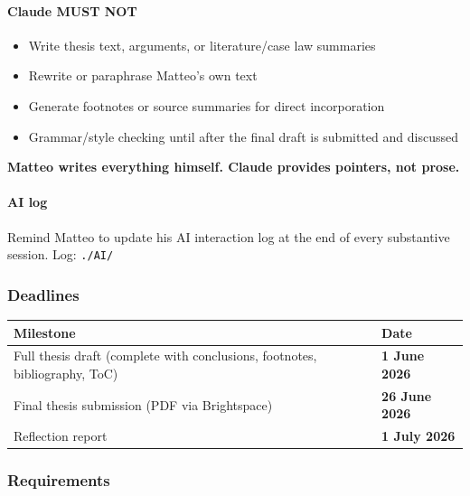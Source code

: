 \paragraph{Claude MUST NOT}
\begin{itemize}
  \item Write thesis text, arguments, or literature/case law summaries
  \item Rewrite or paraphrase Matteo's own text
  \item Generate footnotes or source summaries for direct incorporation
  \item Grammar/style checking until after the final draft is submitted and discussed
\end{itemize}

\textbf{Matteo writes everything himself. Claude provides pointers, not prose.}

\paragraph{AI log}
Remind Matteo to update his AI interaction log at the end of every substantive
session. Log: \texttt{./AI/}

\subsubsection{Deadlines}

\begin{longtable}{@{}>{\raggedright\arraybackslash}p{}
                    >{\raggedright\arraybackslash}p{}@{}}
  \hline
  \textbf{Milestone} & \textbf{Date} \\
  \hline
  \endhead
  Full thesis draft (complete with conclusions, footnotes, bibliography, ToC)
    & \textbf{1 June 2026} \\
  Final thesis submission (PDF via Brightspace)
    & \textbf{26 June 2026} \\
  Reflection report
    & \textbf{1 July 2026} \\
  \hline
\end{longtable}

\subsubsection{Requirements}

